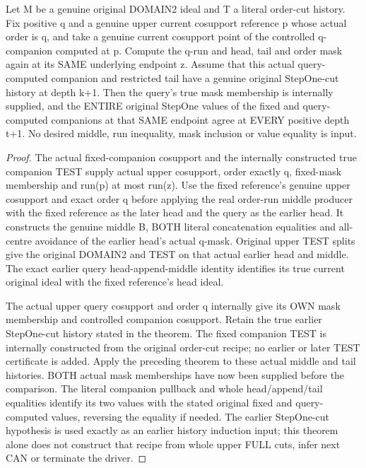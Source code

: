 \begin{theorem}
\label{hir:original-fixed-companion-own-stepone-comparison}
\leanok
Let M be a genuine original DOMAIN2 ideal and T a literal order-cut history.
Fix positive q and a genuine upper current cosupport reference p whose
actual order is q, and take a genuine current cosupport
point of the controlled q-companion computed at p. Compute the q-run and
head, tail and order mask again at its SAME underlying endpoint z. Assume
that this actual query-computed companion and restricted tail have a
genuine original StepOne-cut history at depth k+1. Then the query's true
mask membership is internally supplied, and the ENTIRE original StepOne
values of the fixed and query-computed companions at that SAME endpoint
agree at EVERY positive depth t+1. No desired middle, run inequality,
mask inclusion or value equality is input.
\end{theorem}
\begin{proof}
The actual fixed-companion cosupport and the internally constructed true
companion TEST supply actual upper cosupport, order exactly q, fixed-mask
membership and run(p) at most run(z). Use the fixed reference's genuine upper cosupport and exact order q before applying the real order-run middle
producer with the fixed reference as the later head and the query as the
earlier head. It constructs the genuine middle B, BOTH literal
concatenation equalities and all-centre avoidance of the earlier head's
actual q-mask. Original upper TEST splits give the original DOMAIN2 and
TEST on that actual earlier head and middle. The exact earlier query
head-append-middle identity identifies its true current original ideal
with the fixed reference's head ideal.

The actual upper query cosupport and order q internally give its OWN mask
membership and controlled companion cosupport. Retain the true earlier
StepOne-cut history stated in the theorem. The fixed companion TEST is
internally constructed from the original order-cut recipe; no earlier or
later TEST certificate is added. Apply the preceding theorem to these
actual middle and tail histories. BOTH actual mask memberships have now
been supplied before the comparison. The literal companion pullback and
whole head/append/tail equalities identify its two values with the stated
original fixed and query-computed values, reversing the equality if
needed. The earlier StepOne-cut hypothesis is used exactly as an earlier
history induction input; this theorem alone does not construct that
recipe from whole upper FULL cuts, infer next CAN or terminate the driver.
\end{proof}
